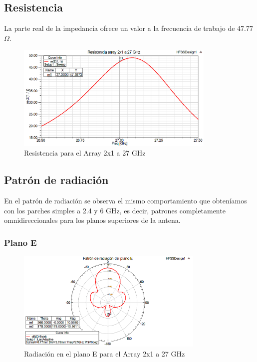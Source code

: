 \subsection{Resistencia}
\par La parte real de la impedancia ofrece un valor a la frecuencia de trabajo de 47.77 $\Omega$.
\\
\begin{figure}[H]
    \centering
        \includegraphics[width=0.85\textwidth]{archivos/analisis/2x13/3}
        \caption{Resistencia para el Array 2x1 a 27 GHz}
        \label{fig:resis2x13}
\end{figure}


\subsection{Patrón de radiación}
\par En el patrón de radiación se observa el mismo comportamiento que obteníamos con los parches simples a 2.4 y 6 GHz, es decir, patrones completamente omnidireccionales para los planos superiores de la antena.
\\
\subsubsection{Plano E}
\begin{figure}[H]
    \centering
        \includegraphics[width=0.8\textwidth]{archivos/analisis/2x13/4}
        \caption{Radiación en el plano E para el Array 2x1 a 27 GHz}
        \label{fig:E2x13}
\end{figure}

